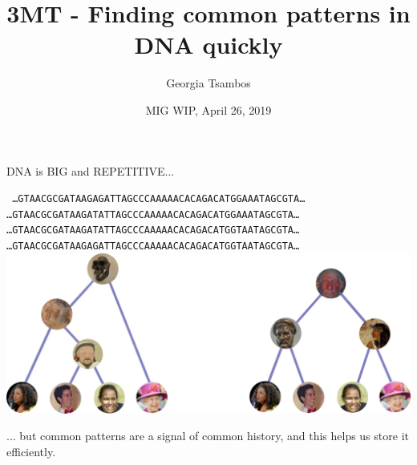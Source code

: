 \documentclass[11pt, mathserif, aspectratio=43]{beamer}
\title{3MT - Finding common patterns in DNA quickly}
\author{Georgia Tsambos}
\institute{{\normalsize Supervisors: Damjan Vukcevic and Stephen Leslie}}
\date{MIG WIP, April 26, 2019}
\newcommand{\Cskyblue}[1]{\textcolor{Cskyblue}{#1}}
\newcommand{\Cvermillion}[1]{\textcolor{Cvermillion}{#1}}
\begin{document}
\begin{frame}
DNA is BIG and REPETITIVE...
\vspace{5mm}
\begin{center}
{\tt\scriptsize
\ldots GTAACGCGATAAGA\Cvermillion{G}ATTAGCCCAAAAACACAGACATGG\Cvermillion{A}AATAGCGTA\ldots \\
\ldots GTAACGCGATAAGA\Cskyblue{T}ATTAGCCCAAAAACACAGACATGG\Cvermillion{A}AATAGCGTA\ldots \\
\ldots GTAACGCGATAAGA\Cskyblue{T}ATTAGCCCAAAAACACAGACATGG\Cskyblue{T}AATAGCGTA\ldots \\
\ldots GTAACGCGATAAGA\Cvermillion{G}ATTAGCCCAAAAACACAGACATGG\Cskyblue{T}AATAGCGTA\ldots \\
}
\vspace{5mm}
\includegraphics[scale=.25]{tree-seq-person.png}
\end{center}
\vspace{5mm}
... but common patterns are a signal of common history, and this helps us store it efficiently.
\end{frame}
\end{document}
